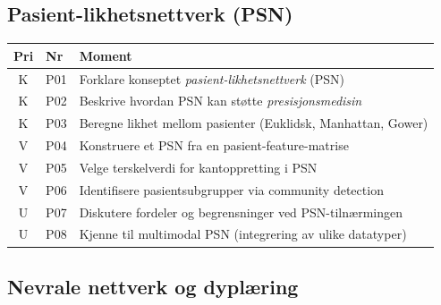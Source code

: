 \documentclass[11pt,a4paper]{article}
\begin{document}
\subsection{Pasient-likhetsnettverk (PSN)}

\begin{longtable}{@{}clp{9cm}@{}}
\toprule
\textbf{Pri} & \textbf{Nr} & \textbf{Moment} \\
\midrule
\endfirsthead
\midrule
\endhead
\midrule
\endfoot
\bottomrule
\endlastfoot
K & P01 & Forklare konseptet \emph{pasient-likhetsnettverk} (PSN) \\
K & P02 & Beskrive hvordan PSN kan støtte \emph{presisjonsmedisin} \\
K & P03 & Beregne likhet mellom pasienter (Euklidsk, Manhattan, Gower) \\
V & P04 & Konstruere et PSN fra en pasient-feature-matrise \\
V & P05 & Velge terskelverdi for kantoppretting i PSN \\
V & P06 & Identifisere pasientsubgrupper via community detection \\
U & P07 & Diskutere fordeler og begrensninger ved PSN-tilnærmingen \\
U & P08 & Kjenne til multimodal PSN (integrering av ulike datatyper) \\
\end{longtable}

\subsection{Nevrale nettverk og dyplæring}
\end{document}
